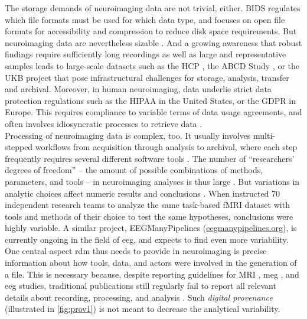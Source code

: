 The storage demands of neuroimaging data are not trivial, either.
\gls{BIDS} regulates which file formats must be used for which data type, and focuses on open file formats for accessibility and compression to reduce disk space requirements.
But neuroimaging data are nevertheless sizable \citep{van2014human}.
And a growing awareness that robust findings require sufficiently long recordings \citep{li2021moving} as well as large and representative samples \citep{button2013power, turner2018small} leads to large-scale datasets such as the \gls{HCP} \citep{van2013wu}, the \gls{ABCD} Study \citep{casey2018adolescent}, or the \gls{UKB} project \citep{matthews2015uk} that pose infrastructural challenges for storage, analysis, transfer and archival.
Moreover, in human neuroimaging, data underlie strict data protection regulations such as the \gls{HIPAA} in the United States, or the \gls{GDPR} in Europe.
This requires compliance to variable terms of data usage agreements, and often involves idiosyncratic processes to retrieve data \citep{waitedata}.\\
Processing of neuroimaging data is complex, too.
It usually involves multi-stepped workflows from acquisition through analysis to archival, where each step frequently requires several different software tools \citep{poline2011, NISO2022119623}.
The number of ``researchers' degrees of freedom'' -- the amount of possible combinations of methods, parameters, and tools -- in neuroimaging analyses is thus large \citep{bowring2019exploring}.
But variations in analytic choices affect numeric results and conclusions \citep{silberzahn2018}.
When \citet{botvinik2020variability} instructed 70 independent research teams to analyze the same task-based \gls{fMRI} dataset with tools and methods of their choice to test the same hypotheses, conclusions were highly variable.
A similar project, EEGManyPipelines (\href{https://eegmanypipelines.org/}{eegmanypipelines.org}), is currently ongoing in the field of \gls{eeg}, and expects to find even more variability.
One central aspect \gls{rdm} thus needs to provide in neuroimaging is precise information about how tools, data, and actors were involved in the generation of a file.
This is necessary because, despite reporting guidelines for \gls{MRI} \citep{nichols2017best}, \gls{meg} \citep{pernet2020issues}, and \gls{eeg} \citep{styles2021towards} studies, traditional publications still regularly fail to report all relevant details about recording, processing, and analysis  \citep[see, e.g.,][]{vsovskic2022better}.
Such \textit{digital provenance} (illustrated in \cref{fig:prov1}) is not meant to decrease the analytical variability.
